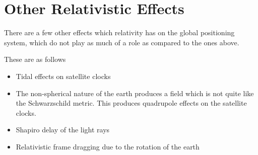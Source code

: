 \section{Other Relativistic Effects}

There are a few other effects which relativity has on the global positioning system, which do not play as much of a role as compared to the ones above.

These are as follows \cite{ashby-llr, ashby}

\begin{itemize}
	\item Tidal effects on satellite clocks
	\item The non-spherical nature of the earth produces a field which is not quite like the Schwarzschild metric. This produces quadrupole effects on the satellite clocks.
	\item Shapiro delay of the light rays
	\item Relativistic frame dragging due to the rotation of the earth
\end{itemize}